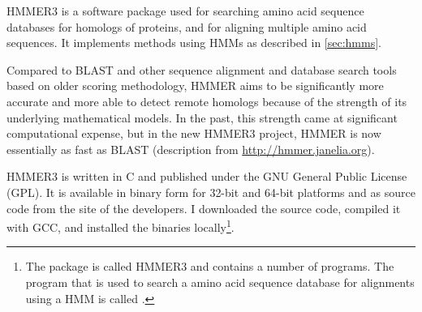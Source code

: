 HMMER3  \citep{eddy2011} is a software package used for searching amino acid
sequence databases for homologs of proteins, and for aligning multiple amino
acid sequences. It implements methods using HMMs as described in
\autoref{sec:hmms}.

Compared to BLAST and other sequence alignment and database search tools based
on older scoring methodology, HMMER aims to be significantly more accurate and
more able to detect remote homologs because of the strength of its underlying
mathematical models. In the past, this strength came at significant
computational expense, but in the new HMMER3 project, HMMER is now essentially
as fast as BLAST (description from \url{http://hmmer.janelia.org}).

HMMER3 is written in C and published under the GNU General Public License (GPL).
It is available in binary form for 32-bit and 64-bit platforms and as source
code from the site of the developers. I downloaded the source code, compiled it
with GCC, and installed the binaries locally\footnote{The package is called
HMMER3 and contains a number of programs. The program that is used to search a
amino acid sequence database for alignments using a HMM is called
.}. 

